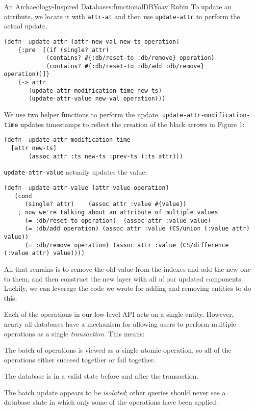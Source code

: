 \begin{aosachapter}{An Archaeology-Inspired Database}{s:functionalDB}{Yoav Rubin}
To update an attribute, we locate it with \texttt{attr-at} and then use
\texttt{update-attr} to perform the actual update.

\begin{verbatim}
(defn- update-attr [attr new-val new-ts operation]
    {:pre  [(if (single? attr)
            (contains? #{:db/reset-to :db/remove} operation)
            (contains? #{:db/reset-to :db/add :db/remove} operation))]}
    (-> attr
       (update-attr-modification-time new-ts)
       (update-attr-value new-val operation)))
\end{verbatim}

We use two helper functions to perform the update.
\texttt{update-attr-modification-time} updates timestamps to reflect the
creation of the black arrows in Figure 1:

\begin{verbatim}
(defn- update-attr-modification-time  
  [attr new-ts]
       (assoc attr :ts new-ts :prev-ts (:ts attr)))
\end{verbatim}

\texttt{update-attr-value} actually updates the value:

\begin{verbatim}
(defn- update-attr-value [attr value operation]
   (cond
      (single? attr)    (assoc attr :value #{value})
    ; now we're talking about an attribute of multiple values
      (= :db/reset-to operation)  (assoc attr :value value)
      (= :db/add operation) (assoc attr :value (CS/union (:value attr) value))
      (= :db/remove operation) (assoc attr :value (CS/difference (:value attr) value))))
\end{verbatim}

All that remains is to remove the old value from the indexes and add the
new one to them, and then construct the new layer with all of our
updated components. Luckily, we can leverage the code we wrote for
adding and removing entities to do this.

\label{transactions}

Each of the operations in our low-level API acts on a single entity.
However, nearly all databases have a mechanism for allowing users to
perform multiple operations as a single \emph{transaction}. This means:

\begin{aosaitemize}

\item
  The batch of operations is viewed as a single atomic operation, so all
  of the operations either succeed together or fail together.
\item
  The database is in a valid state before and after the transaction.
\item
  The batch update appears to be \emph{isolated}; other queries should
  never see a database state in which only some of the operations have
  been applied.
\end{aosaitemize}


\end{aosachapter}

